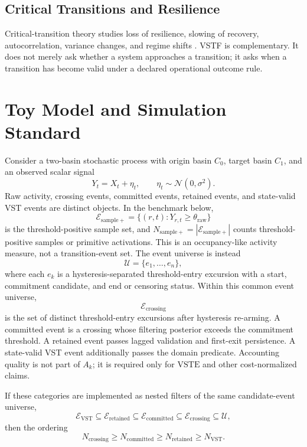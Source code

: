 \documentclass[11pt,a4paper]{article}
\newcommand{\VST}{\ensuremath{\mathrm{VST}}}
\newcommand{\VSTE}{\ensuremath{\mathrm{VSTE}}}
\newcommand{\1}{\mathbf{1}}
\begin{document}
\subsection{Critical Transitions and Resilience}

Critical-transition theory studies loss of resilience, slowing of recovery, autocorrelation, variance changes, and regime shifts \cite{kramers1940,scheffer2009,scheffer2018}. VSTF is complementary. It does not merely ask whether a system approaches a transition; it asks when a transition has become valid under a declared operational outcome rule.

\section{Toy Model and Simulation Standard}

Consider a two-basin stochastic process with origin basin $C_0$, target basin $C_1$, and an observed scalar signal
\[
  Y_t = X_t+\eta_t,
  \qquad
  \eta_t\sim \mathcal{N}(0,\sigma^2).
\]
Raw activity, crossing events, committed events, retained events, and state-valid VST events are distinct objects. In the benchmark below,
\[
  \mathcal{E}_{\mathrm{sample+}}
  =
  \{(r,t):Y_{r,t}\geq \theta_{\mathrm{raw}}\}
\]
is the threshold-positive sample set, and $N_{\mathrm{sample+}}=|\mathcal{E}_{\mathrm{sample+}}|$ counts threshold-positive samples or primitive activations. This is an occupancy-like activity measure, not a transition-event set. The event universe is instead
\[
  \mathcal{U}=\{e_1,\ldots,e_n\},
\]
where each $e_k$ is a hysteresis-separated threshold-entry excursion with a start, commitment candidate, and end or censoring status. Within this common event universe,
\[
  \mathcal{E}_{\mathrm{crossing}}
\]
is the set of distinct threshold-entry excursions after hysteresis re-arming. A committed event is a crossing whose filtering posterior exceeds the commitment threshold. A retained event passes lagged validation and first-exit persistence. A state-valid VST event additionally passes the domain predicate. Accounting quality is not part of $A_k$; it is required only for \VSTE{} and other cost-normalized claims.

If these categories are implemented as nested filters of the same candidate-event universe,
\[
  \mathcal{E}_{\VST}
  \subseteq
  \mathcal{E}_{\mathrm{retained}}
  \subseteq
  \mathcal{E}_{\mathrm{committed}}
  \subseteq
  \mathcal{E}_{\mathrm{crossing}}
  \subseteq
  \mathcal{U},
\]
then the ordering
\[
  N_{\mathrm{crossing}}
  \geq
  N_{\mathrm{committed}}
  \geq
  N_{\mathrm{retained}}
  \geq
  N_{\VST}.
\]
\end{document}
